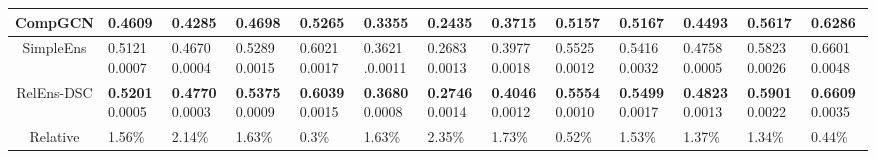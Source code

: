 \documentclass[11pt,a4paper]{article}
\begin{document}
\begin{table*}[ht]
\begin{tabular}{c|C{26pt}C{26pt}C{26pt}C{30pt}|C{26pt}C{26pt}C{26pt}C{30pt}|C{26pt}C{26pt}C{26pt}C{30pt}}
  		CompGCN      & 0.4609                      & 0.4285                         & 0.4698                       & 0.5265          & 0.3355          & 0.2435          & 0.3715          & 0.5157          & 0.5167          & 0.4493          & 0.5617          & 0.6286          \\ 
  		\midrule
  		SimpleEns    & 0.5121   {\scriptsize0.0007}                   & 0.4670    {\scriptsize0.0004}                     & 0.5289   {\scriptsize0.0015}                     & 0.6021   {\scriptsize0.0017}        & 0.3621   {\scriptsize.0.0011}        & 0.2683    {\scriptsize0.0013}        & 0.3977  {\scriptsize0.0018}         & 0.5525 {\scriptsize0.0012}         & 0.5416  {\scriptsize0.0032}         & 0.4758  {\scriptsize0.0005}         & 0.5823 {\scriptsize0.0026}          & 0.6601  {\scriptsize0.0048}         \\ \midrule
  		RelEns-DSC & \textbf{0.5201}   {\scriptsize0.0005}          & \textbf{0.4770} {\scriptsize0.0003}                & \textbf{0.5375} {\scriptsize0.0009}              & \textbf{0.6039} {\scriptsize0.0015} & \textbf{0.3680} {\scriptsize0.0008} & \textbf{0.2746} {\scriptsize0.0014} & \textbf{0.4046} {\scriptsize0.0012} & \textbf{0.5554} {\scriptsize0.0010} & \textbf{0.5499} {\scriptsize0.0017} & \textbf{0.4823} {\scriptsize0.0013} & \textbf{0.5901} {\scriptsize0.0022} & \textbf{0.6609} {\scriptsize0.0035} \\
  		Relative  & 1.56\% & 2.14\%   & 1.63\% & 0.3\% & 1.63\% & 2.35\%  & 1.73\%  &  0.52\%  &  1.53\%  & 1.37\%  & 1.34\%   & 0.44\%  \\   \bottomrule
  	\end{tabular}
  	\label{tab:performance}
  \end{table*}
\end{document}
